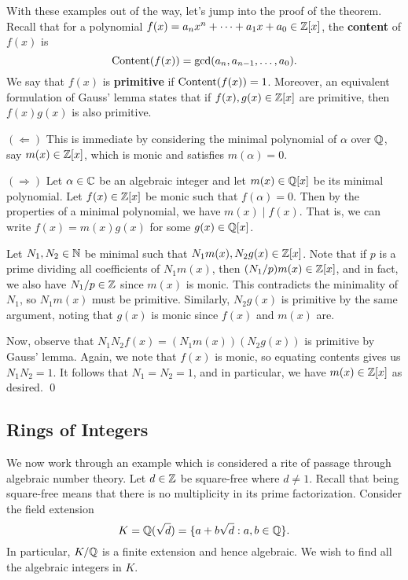 With these examples out of the way, let's jump into the proof of the theorem. 
Recall that for a polynomial $f(x) = a_n x^n + \cdots + a_1 x + a_0 \in \mathbb{Z}[x]$, 
the {\bf content} of $f(x)$ is 
\[ \operatorname{Content}(f(x)) = \gcd(a_n, a_{n-1}, \dots, a_0). \] 
We say that $f(x)$ is {\bf primitive} if $\operatorname{Content}(f(x)) = 1$. Moreover, 
an equivalent formulation of Gauss' lemma states that if $f(x), g(x) \in \mathbb{Z}[x]$ 
are primitive, then $f(x)g(x)$ is also primitive.

\begin{pf}
    $(\Leftarrow)$ This is immediate by considering the minimal polynomial 
    of $\alpha$ over $\mathbb{Q}$, say $m(x) \in \mathbb{Z}[x]$, which is monic and satisfies 
    $m(\alpha) = 0$. 

    $(\Rightarrow)$ Let $\alpha \in \mathbb{C}$ be an algebraic integer and let
    $m(x) \in \mathbb{Q}[x]$ be its minimal polynomial. Let $f(x) \in \mathbb{Z}[x]$ be 
    monic such that $f(\alpha) = 0$. Then by the properties of a minimal 
    polynomial, we have $m(x) \mid f(x)$. That is, we can write $f(x) = 
    m(x)g(x)$ for some $g(x) \in \mathbb{Q}[x]$. 

    Let $N_1, N_2 \in \mathbb{N}$ be minimal such that $N_1 m(x), N_2 g(x) \in \mathbb{Z}[x]$. 
    Note that if $p$ is a prime dividing all coefficients of $N_1 m(x)$, 
    then $(N_1/p)m(x) \in \mathbb{Z}[x]$, and in fact, we also have $N_1/p \in \mathbb{Z}$ 
    since $m(x)$ is monic. This contradicts the minimality of $N_1$, so 
    $N_1 m(x)$ must be primitive. Similarly, $N_2 g(x)$ is primitive by 
    the same argument, noting that $g(x)$ is monic since $f(x)$ and $m(x)$ are. 

    Now, observe that $N_1 N_2 f(x) = (N_1 m(x))(N_2 g(x))$ is primitive by 
    Gauss' lemma. Again, we note that $f(x)$ is monic, so equating contents 
    gives us $N_1 N_2 = 1$. It follows that $N_1 = N_2 = 1$, and 
    in particular, we have $m(x) \in \mathbb{Z}[x]$ as desired. \qed
\end{pf}

\subsection{Rings of Integers}\label{subsec:1.3}
We now work through an example which is considered a rite of passage through 
algebraic number theory. Let $d \in \mathbb{Z}$ be square-free where $d \neq 1$. 
Recall that being square-free means that there is no multiplicity in its 
prime factorization. Consider the field extension
\[ K = \mathbb{Q}(\sqrt{d}) = \{a + b\sqrt{d} : a, b \in \mathbb{Q}\}. \] 
In particular, $K/\mathbb{Q}$ is a finite extension and hence algebraic. We wish to 
find all the algebraic integers in $K$.


